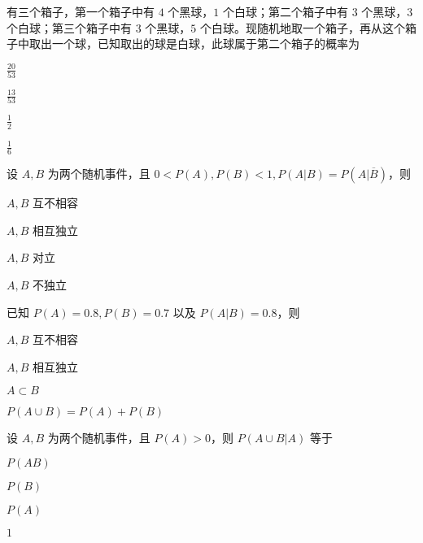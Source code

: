 \documentclass{exam-zh}
\begin{document}
\begin{question}
  有三个箱子，第一个箱子中有 $4$ 个黑球，$1$ 个白球；第二个箱子中有 $3$ 个黑球，$3$ 个白球；第三个箱子中有 $3$ 个黑球，$5$ 个白球。现随机地取一个箱子，再从这个箱子中取出一个球，已知取出的球是白球，此球属于第二个箱子的概率为 \paren[A]
  \begin{choices}
    \item $\frac{20}{53}$  
    \item $\frac{13}{53}$  
    \item $\frac{1}{2}$  
    \item $\frac{1}{6}$  
  \end{choices}
\end{question}

\begin{question}
  设 $A, B$ 为两个随机事件，且 $0 < P(A), P(B) < 1, P(A|B) = P(A|\overline{B})$，则 \paren[B]
  \begin{choices}
    \item $A, B$ 互不相容  
    \item $A, B$ 相互独立  
    \item $A, B$ 对立  
    \item $A, B$ 不独立  
  \end{choices}
\end{question}

\begin{question}
  已知 $P(A) = 0.8, P(B) = 0.7$ 以及 $P(A|B) = 0.8$，则 \paren[B]
  \begin{choices}
    \item $A, B$ 互不相容  
    \item $A, B$ 相互独立  
    \item $A \subset B$  
    \item $P(A \cup B) = P(A) + P(B)$  
  \end{choices}
\end{question}

\begin{question}
  设 $A, B$ 为两个随机事件，且 $P(A) > 0$，则  
  $P(A \cup B | A)$ 等于 \paren[D]
  \begin{choices}
    \item $P(AB)$  
    \item $P(B)$  
    \item $P(A)$ 
    \item $1$ 
  \end{choices}
\end{question}
\end{document}
